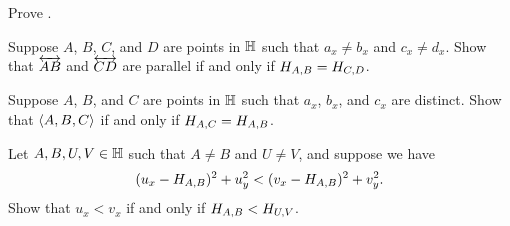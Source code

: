 \Exercises%

\begin{exercise}
Prove .
\end{exercise}


\begin{exercise}\label{exerc:hhp-parallel-criterion}
Suppose \(A\), \(B\), \(C\), and \(D\) are points in \(\mathbb{H}\) such that \(a_x \neq b_x\) and \(c_x \neq d_x\).
Show that \(\overleftrightarrow{AB}\) and \(\overleftrightarrow{CD}\) are parallel if and only if \(H_{A,B} = H_{C,D}\).
\end{exercise}


\begin{exercise}\label{exerc:hhp-collinearity-criterion}
Suppose \(A\), \(B\), and \(C\) are points in \(\mathbb{H}\) such that \(a_x\), \(b_x\), and \(c_x\) are distinct.
Show that \(\langle A, B, C \rangle\) if and only if \(H_{A,C} = H_{A,B}\).
\end{exercise}


\begin{exercise}\label{exerc:hhp-ideal-point-inequality}
Let \(A,B,U,V \in \mathbb{H}\) such that \(A \neq B\) and \(U \neq V\), and suppose we have \[ (u_x - H_{A,B})^2 + u_y^2 < (v_x - H_{A,B})^2 + v_y^2. \]
Show that \(u_x < v_x\) if and only if \(H_{A,B} < H_{U,V}\).
\end{exercise}
